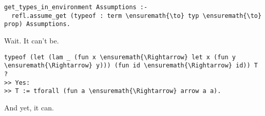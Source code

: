 \begin{verbatim}
get_types_in_environment Assumptions :-
  refl.assume_get (typeof : term \ensuremath{\to} typ \ensuremath{\to} prop) Assumptions.
\end{verbatim}

\heroSTUDENT{} Wait. It can't be.

\begin{verbatim}
typeof (let (lam _ (fun x \ensuremath{\Rightarrow} let x (fun y \ensuremath{\Rightarrow} y))) (fun id \ensuremath{\Rightarrow} id)) T ?
>> Yes:
>> T := tforall (fun a \ensuremath{\Rightarrow} arrow a a).
\end{verbatim}

\heroADVISOR{} And yet, it can.
